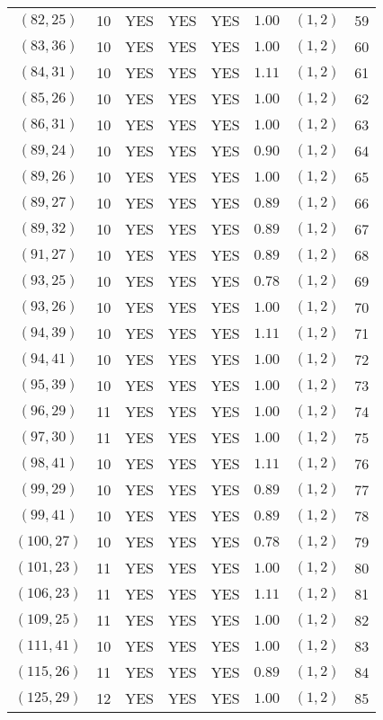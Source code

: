 \begin{longtable}{|c|c|c|c|c|c|c|c|}
$(82,25)$ & 10 & YES & YES & YES & $1.00$ & $(1,2)$ & 59\\
$(83,36)$ & 10 & YES & YES & YES & $1.00$ & $(1,2)$ & 60\\
$(84,31)$ & 10 & YES & YES & YES & $1.11$ & $(1,2)$ & 61\\
$(85,26)$ & 10 & YES & YES & YES & $1.00$ & $(1,2)$ & 62\\
$(86,31)$ & 10 & YES & YES & YES & $1.00$ & $(1,2)$ & 63\\
$(89,24)$ & 10 & YES & YES & YES & $0.90$ & $(1,2)$ & 64\\
$(89,26)$ & 10 & YES & YES & YES & $1.00$ & $(1,2)$ & 65\\
$(89,27)$ & 10 & YES & YES & YES & $0.89$ & $(1,2)$ & 66\\
$(89,32)$ & 10 & YES & YES & YES & $0.89$ & $(1,2)$ & 67\\
$(91,27)$ & 10 & YES & YES & YES & $0.89$ & $(1,2)$ & 68\\
$(93,25)$ & 10 & YES & YES & YES & $0.78$ & $(1,2)$ & 69\\
$(93,26)$ & 10 & YES & YES & YES & $1.00$ & $(1,2)$ & 70\\
$(94,39)$ & 10 & YES & YES & YES & $1.11$ & $(1,2)$ & 71\\
$(94,41)$ & 10 & YES & YES & YES & $1.00$ & $(1,2)$ & 72\\
$(95,39)$ & 10 & YES & YES & YES & $1.00$ & $(1,2)$ & 73\\
$(96,29)$ & 11 & YES & YES & YES & $1.00$ & $(1,2)$ & 74\\
$(97,30)$ & 11 & YES & YES & YES & $1.00$ & $(1,2)$ & 75\\
$(98,41)$ & 10 & YES & YES & YES & $1.11$ & $(1,2)$ & 76\\
$(99,29)$ & 10 & YES & YES & YES & $0.89$ & $(1,2)$ & 77\\
$(99,41)$ & 10 & YES & YES & YES & $0.89$ & $(1,2)$ & 78\\
$(100,27)$ & 10 & YES & YES & YES & $0.78$ & $(1,2)$ & 79\\
$(101,23)$ & 11 & YES & YES & YES & $1.00$ & $(1,2)$ & 80\\
$(106,23)$ & 11 & YES & YES & YES & $1.11$ & $(1,2)$ & 81\\
$(109,25)$ & 11 & YES & YES & YES & $1.00$ & $(1,2)$ & 82\\
$(111,41)$ & 10 & YES & YES & YES & $1.00$ & $(1,2)$ & 83\\
$(115,26)$ & 11 & YES & YES & YES & $0.89$ & $(1,2)$ & 84\\
$(125,29)$ & 12 & YES & YES & YES & $1.00$ & $(1,2)$ & 85\\

\end{longtable}
